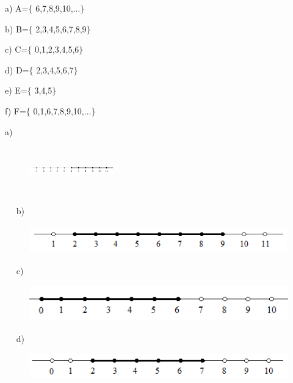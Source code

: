 \begin{respostas}{2}
	\ansitem{}
	\begin{multicols}{3}
		
	a) A=$ \{ $ 6,7,8,9,10,...$ \} $
	
	b) B=$ \{ $ 2,3,4,5,6,7,8,9$ \} $
	
	c) C=$ \{ $ 0,1,2,3,4,5,6$ \} $ 

	d) D=$ \{ $ 2,3,4,5,6,7$ \} $
	
	e) E=$ \{ $ 3,4,5$ \} $ 
	
	f) F=$ \{ $ 0,1,6,7,8,9,10,...$ \} $ 
	\end{multicols}
	\ansitem{}
a) 
\begin{figure}[H]
	\begin{Center}
		\includegraphics[width=1.46in,height=0.8in]{capitulos/conjuntos_numericos/media/image11.png}
	\end{Center}
\end{figure}
~~
b) 
\begin{figure}[H]
	\begin{Center}
		\includegraphics[width=4.4in,height=0.48in]{capitulos/conjuntos_numericos/media/image12.png}
	\end{Center}
\end{figure}
~~
c)
\begin{figure}[H]
	\begin{Center}
		\includegraphics[width=4.56in,height=0.61in]{capitulos/conjuntos_numericos/media/image13.png}
	\end{Center}
\end{figure}
~~
d)
\begin{figure}[H]
	\begin{Center}
		\includegraphics[width=4.84in,height=0.45in]{capitulos/conjuntos_numericos/media/image14.png}

\end{Center}
\end{figure}
\end{respostas}
